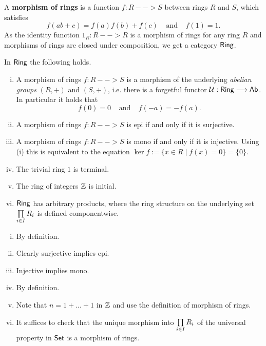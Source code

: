 
	\begin{definition}
		A \textbf{morphism of rings} is a function $f:R --> S$ between rings $R$ and $S$, which satisfies
		\begin{equation*}
			f(ab + c) = f(a)f(b) + f(c) \;\;\;\;\text{and}\;\;\;\; f(1) = 1.
		\end{equation*}
		As the identity function $1_R: R --> R$ is a morphism of rings for any ring $R$ and morphisms of rings are closed under composition, we get a category $\textsf{Ring}$.
	\end{definition}

	\begin{lemma}
		In $\textsf{Ring}$ the following holds.
		\begin{enumerate}[(i)]
			\item{
				A morphism of rings $f:R-->S$ is a morphism of the underlying \textit{abelian groups} $(R,+)$ and $(S,+)$, i.e. there is a forgetful functor $\mathcal{U}:\textsf{Ring} --> \textsf{Ab}$. In particular it holds that
				\begin{equation*}
					f(0) = 0 \;\;\;\;\text{and}\;\;\;\; f(-a) = -f(a).
				\end{equation*}
			}
			\item{
				A morphism of rings $f:R --> S$ is epi if and only if it is surjective.
			}
			\item{
				A morphism of rings $f:R --> S$ is mono if and only if it is injective. Using (i) this is equivalent to the equation $\ker f := \{x \in R \mid f(x) = 0\} = \{0\}$.
			}
			\item{
				The trivial ring $1$ is terminal.
			}
			\item{
				The ring of integers $\mathbb{Z}$ is initial.
			}
			\item{
				$\textsf{Ring}$ has arbitrary products, where the ring structure on the underlying set $\prod \limits_{i \in I} R_i$ is defined componentwise.
			}
		\end{enumerate}
	\end{lemma}
	\begin{sketch}
		\begin{enumerate}[(i)]
			\item{
				By definition.
			}
			\item{
				Clearly surjective implies epi. 
			}
			\item{
				Injective implies mono. 
			}
			\item{
				By definition.
			}
			\item{
				Note that $n = 1 + ... + 1$ in $\mathbb{Z}$ and use the definition of morphism of rings. 
			}
			\item{
				It suffices to check that the unique morphism into $\prod \limits_{i \in I} R_i$ of the universal property in $\textsf{Set}$ is a morphism of rings.
			}
		\end{enumerate}\vspace{-2em}
	\end{sketch}

